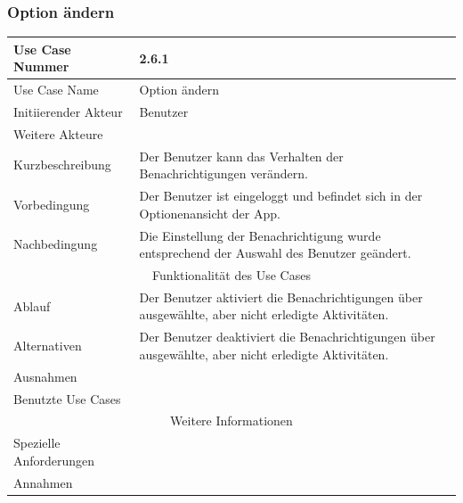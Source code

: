 \documentclass[10pt,a4paper]{article}
\begin{document}
\subsubsection{Option \"andern}
	\begin{tabularx}{\textwidth}{|l|X|}
	\hline Use Case Nummer & 2.6.1 \\ 
	\hline Use Case Name & Option \"andern \\ 
	\hline Initiierender Akteur & Benutzer \\
	\hline Weitere Akteure &  \\
	\hline Kurzbeschreibung & Der Benutzer kann das Verhalten der Benachrichtigungen verändern. \\
	\hline Vorbedingung & Der Benutzer ist eingeloggt und befindet sich in der Optionenansicht der App. \\
	\hline Nachbedingung & Die Einstellung der Benachrichtigung wurde entsprechend der Auswahl des Benutzer geändert. \\
	\hline \multicolumn{2}{|c|}{Funktionalität des Use Cases}\\
	\hline Ablauf & Der Benutzer aktiviert die Benachrichtigungen über ausgewählte, aber nicht erledigte Aktivitäten. \\
	\hline Alternativen & Der Benutzer deaktiviert die Benachrichtigungen über ausgewählte, aber nicht erledigte Aktivitäten. \\
	\hline Ausnahmen &  \\
	\hline Benutzte Use Cases &  \\
	\hline \multicolumn{2}{|c|}{Weitere Informationen} \\
	\hline Spezielle Anforderungen &  \\
	\hline Annahmen &  \\
	\hline
	\end{tabularx}
\end{document}
